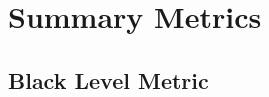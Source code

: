 % 
% 
% 
%
%

\section{Summary Metrics}

\subsection{Black Level Metric}

\ifdefined \meanBlackLevelVariation

